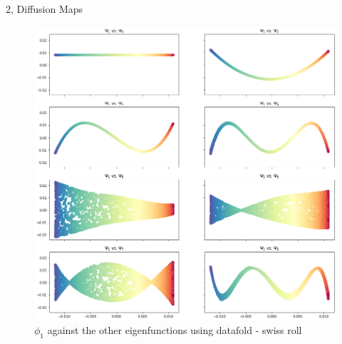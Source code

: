 \documentclass[10pt,a4paper]{article}
\begin{document}
\begin{task}{2, Diffusion Maps}
\pagebreak
\begin{figure}[H]
    \centering
    \includegraphics[scale=0.4]{images/datafold_swiss_roll.png}
    \caption{$\phi_1$ against the other eigenfunctions using datafold - swiss roll}
    \label{fig:datafold-swiss}
\end{figure}

\end{task}
\end{document}
